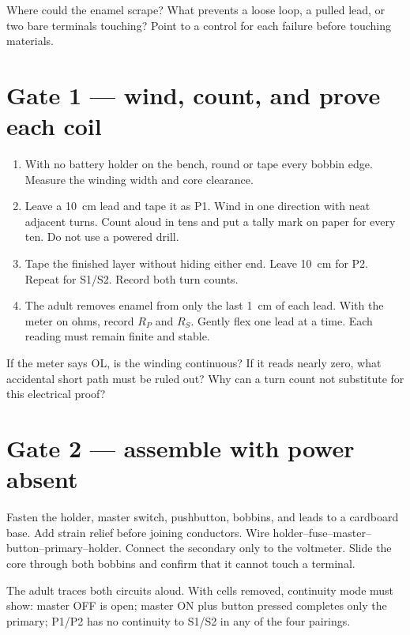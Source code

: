 \coilstateplate

\begin{predict}
Where could the enamel scrape? What prevents a loose loop, a pulled lead, or
two bare terminals touching? Point to a control for each failure before
touching materials.
\end{predict}

\section{Gate 1 --- wind, count, and prove each coil}
\begin{enumerate}
\item With no battery holder on the bench, round or tape every bobbin edge.
Measure the winding width and core clearance.
\item Leave a \qty{10}{cm} lead and tape it as P1. Wind in one direction with
neat adjacent turns. Count aloud in tens and put a tally mark on paper for every
ten. Do not use a powered drill.
\item Tape the finished layer without hiding either end. Leave \qty{10}{cm}
for P2. Repeat for S1/S2. Record both turn counts.
\item The adult removes enamel from only the last \qty{1}{cm} of each lead.
With the meter on ohms, record \(R_P\) and \(R_S\). Gently flex one lead at a
time. Each reading must remain finite and stable.
\end{enumerate}

\begin{predict}
If the meter says OL, is the winding continuous? If it reads nearly zero, what
accidental short path must be ruled out? Why can a turn count not substitute
for this electrical proof?
\end{predict}

\section{Gate 2 --- assemble with power absent}
Fasten the holder, master switch, pushbutton, bobbins, and leads to a cardboard
base. Add strain relief before joining conductors. Wire
holder--fuse--master--button--primary--holder. Connect the secondary only to
the voltmeter. Slide the core through both bobbins and confirm that it cannot
touch a terminal.

The adult traces both circuits aloud. With cells removed, continuity mode must
show: master OFF is open; master ON plus button pressed completes only the
primary; P1/P2 has no continuity to S1/S2 in any of the four pairings.

